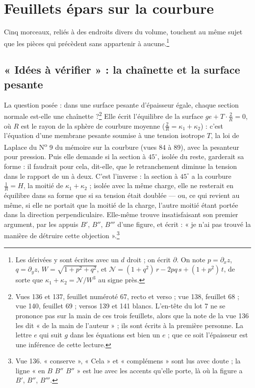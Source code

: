 \documentclass[11pt,a4paper]{article}
\begin{document}
\section*{Feuillets épars sur la courbure}

Cinq morceaux, reliés à des endroits divers du volume, touchent au même sujet
que les pièces qui précèdent sans appartenir à aucune.\footnote{Les dérivées y
sont écrites avec un $d$ droit ; on écrit $\partial$. On note $p = \partial_x
z$, $q = \partial_y z$, $W = \sqrt{1+p^2+q^2}$, et $\mathcal{N} = (1+q^2)\,r -
2pq\,s + (1+p^2)\,t$, de sorte que $\kappa_1+\kappa_2 = \mathcal{N}/W^3$ au signe
près.}

\subsection*{« Idées à vérifier » : la chaînette et la surface pesante}

La question posée : dans une surface pesante d'épaisseur égale, chaque section
normale est-elle une chaînette ?\footnote{Vues 136 et 137, feuillet numéroté 67,
recto et verso ; vue 138, feuillet 68 ; vue 140, feuillet 69 ; versos 139 et
141 blancs. L'en-tête du lot 7 ne se prononce pas sur la main de ces trois
feuillets, alors que la note de la vue 136 les dit « de la main de l'auteur » ;
ils sont écrits à la première personne. La lettre $e$ qui suit $g$ dans les
équations est bien un $e$ ; que ce soit l'épaisseur est une inférence de cette
lecture.} Elle écrit l'équilibre de la surface $ge + T\cdot\frac2R = 0$, où $R$
est le rayon de la sphère de courbure moyenne ($\frac2R = \kappa_1+\kappa_2$) :
c'est l'équation d'une membrane pesante soumise à une tension isotrope $T$, la
loi de Laplace du N\textsuperscript{o} 9 du mémoire sur la courbure (vues 84 à 89), avec la pesanteur pour pression. Puis
elle demande si la section à $45^\circ$, isolée du reste, garderait sa forme :
il faudrait pour cela, dit-elle, que le retranchement diminue la tension dans le
rapport de un à deux. C'est l'inverse : la section à $45^\circ$ a la courbure
$\frac1R = H$, la moitié de $\kappa_1+\kappa_2$ ; isolée avec la même charge, elle
ne resterait en équilibre dans sa forme que si sa tension était doublée — ou, ce
qui revient au même, si elle ne portait que la moitié de la charge, l'autre
moitié étant portée dans la direction perpendiculaire. Elle-même trouve
insatisfaisant son premier argument, par les appuis $B'$, $B''$, $B'''$ d'une
figure, et écrit : « je n'ai pas trouvé la manière de détruire cette
objection ».\footnote{Vue 136. « conserve », « Cela » et « complémens » sont lus
avec doute ; la ligne « en $B$ $B''$ $B''$ » est lue avec les accents qu'elle
porte, là où la figure a $B'$, $B''$, $B'''$.}
\end{document}
